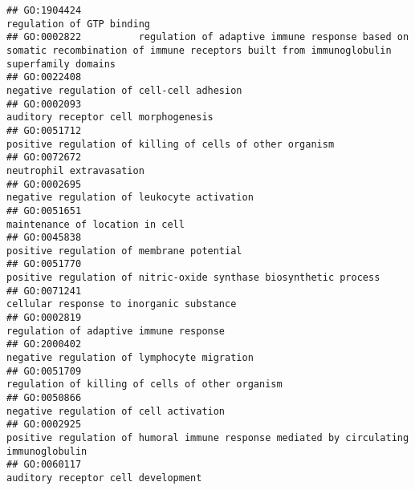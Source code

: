 \documentclass[
]{article}
\begin{document}
\begin{verbatim}
## GO:1904424                                                                                                                        regulation of GTP binding
## GO:0002822          regulation of adaptive immune response based on somatic recombination of immune receptors built from immunoglobulin superfamily domains
## GO:0022408                                                                                                        negative regulation of cell-cell adhesion
## GO:0002093                                                                                                             auditory receptor cell morphogenesis
## GO:0051712                                                                                        positive regulation of killing of cells of other organism
## GO:0072672                                                                                                                         neutrophil extravasation
## GO:0002695                                                                                                      negative regulation of leukocyte activation
## GO:0051651                                                                                                                  maintenance of location in cell
## GO:0045838                                                                                                        positive regulation of membrane potential
## GO:0051770                                                                                positive regulation of nitric-oxide synthase biosynthetic process
## GO:0071241                                                                                                         cellular response to inorganic substance
## GO:0002819                                                                                                           regulation of adaptive immune response
## GO:2000402                                                                                                      negative regulation of lymphocyte migration
## GO:0051709                                                                                                 regulation of killing of cells of other organism
## GO:0050866                                                                                                           negative regulation of cell activation
## GO:0002925                                                            positive regulation of humoral immune response mediated by circulating immunoglobulin
## GO:0060117                                                                                                               auditory receptor cell development

\end{verbatim}
\end{document}
